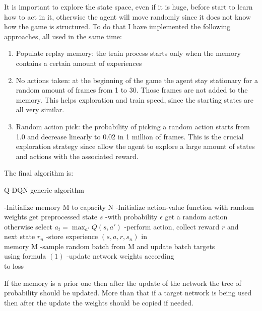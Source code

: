 \documentclass[10pt]{article}
\begin{document}
\begin{multicols}{2}
It is important to explore the state space, even if it is huge, before start to learn how to act in it, otherwise the agent will move randomly since it does not know how the game is structured. To do that I have implemented the following approaches, all used in the same time:
\begin{enumerate}
\item Populate replay memory: the train process starts only when the memory contains a certain amount of experiences
\item No actions taken: at the beginning of the game the agent stay stationary for a random amount of frames from 1 to 30. Those frames are not added to the memory. This helps exploration and train speed, since the starting states are all very similar. 
\item Random action pick: the probability of picking a random action starts from 1.0 and decrease linearly to 0.02 in 1 million of frames. This is the crucial exploration strategy since allow the agent to explore a large amount of states and actions with the associated reward. 
\end{enumerate}

The final algorithm is: 

\begin{algorithm}[H]
\caption{Q-DQN generic algorithm}
\begin{algorithmic} 
\STATE -Initialize memory M to capacity N
\STATE -Initialize action-value function with random weights
\STATE get preprocessed state $s$
\STATE -with probability $\epsilon$ get a random action otherwise select $a_t=\max_{a'} Q(s, a')$ 
\STATE -perform action, collect reward $r$ and \\ next state $r_n$
\STATE -store experience $(s, a, r, s_n)$ in \\ memory M
\STATE -sample random batch from M and
\STATE update batch targets 
\\ using formula $(1)$
\STATE -update network weights according \\ to loss
\ENDIF
\ENDWHILE
\ENDFOR
\end{algorithmic}
\end{algorithm}

If the memory is a prior one then after the update of the network the tree of probability should be updated. More than that if a target network is being used then after the update the weights should be copied if needed.


\end{multicols}
\end{document}
